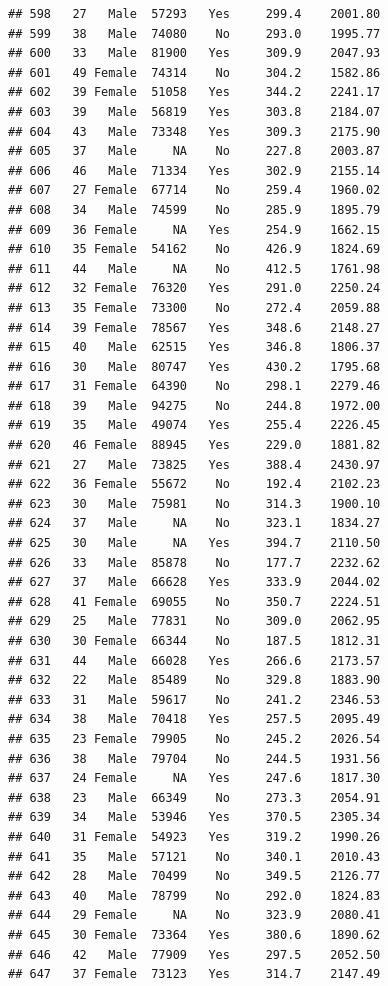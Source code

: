 \documentclass[12pt,]{krantz}
\theoremstyle{definition}
\theoremstyle{definition}
\theoremstyle{remark}
\begin{document}
\begin{verbatim}
## 598   27   Male  57293   Yes     299.4    2001.80
## 599   38   Male  74080    No     293.0    1995.77
## 600   33   Male  81900   Yes     309.9    2047.93
## 601   49 Female  74314    No     304.2    1582.86
## 602   39 Female  51058   Yes     344.2    2241.17
## 603   39   Male  56819   Yes     303.8    2184.07
## 604   43   Male  73348   Yes     309.3    2175.90
## 605   37   Male     NA    No     227.8    2003.87
## 606   46   Male  71334   Yes     302.9    2155.14
## 607   27 Female  67714    No     259.4    1960.02
## 608   34   Male  74599    No     285.9    1895.79
## 609   36 Female     NA   Yes     254.9    1662.15
## 610   35 Female  54162    No     426.9    1824.69
## 611   44   Male     NA    No     412.5    1761.98
## 612   32 Female  76320   Yes     291.0    2250.24
## 613   35 Female  73300    No     272.4    2059.88
## 614   39 Female  78567   Yes     348.6    2148.27
## 615   40   Male  62515   Yes     346.8    1806.37
## 616   30   Male  80747   Yes     430.2    1795.68
## 617   31 Female  64390    No     298.1    2279.46
## 618   39   Male  94275    No     244.8    1972.00
## 619   35   Male  49074   Yes     255.4    2226.45
## 620   46 Female  88945   Yes     229.0    1881.82
## 621   27   Male  73825   Yes     388.4    2430.97
## 622   36 Female  55672    No     192.4    2102.23
## 623   30   Male  75981    No     314.3    1900.10
## 624   37   Male     NA    No     323.1    1834.27
## 625   30   Male     NA   Yes     394.7    2110.50
## 626   33   Male  85878    No     177.7    2232.62
## 627   37   Male  66628   Yes     333.9    2044.02
## 628   41 Female  69055    No     350.7    2224.51
## 629   25   Male  77831    No     309.0    2062.95
## 630   30 Female  66344    No     187.5    1812.31
## 631   44   Male  66028   Yes     266.6    2173.57
## 632   22   Male  85489    No     329.8    1883.90
## 633   31   Male  59617    No     241.2    2346.53
## 634   38   Male  70418   Yes     257.5    2095.49
## 635   23 Female  79905    No     245.2    2026.54
## 636   38   Male  79704    No     244.5    1931.56
## 637   24 Female     NA   Yes     247.6    1817.30
## 638   23   Male  66349    No     273.3    2054.91
## 639   34   Male  53946   Yes     370.5    2305.34
## 640   31 Female  54923   Yes     319.2    1990.26
## 641   35   Male  57121    No     340.1    2010.43
## 642   28   Male  70499    No     349.5    2126.77
## 643   40   Male  78799    No     292.0    1824.83
## 644   29 Female     NA    No     323.9    2080.41
## 645   30 Female  73364   Yes     380.6    1890.62
## 646   42   Male  77909   Yes     297.5    2052.50
## 647   37 Female  73123   Yes     314.7    2147.49

\end{verbatim}
\end{document}
